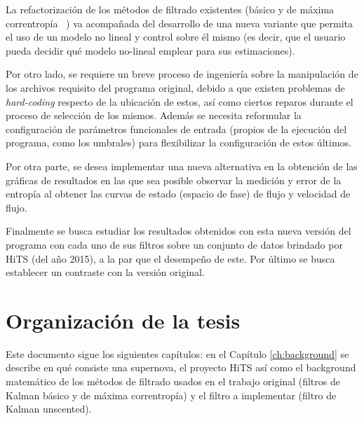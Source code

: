 La refactorizaci\'on de los m\'etodos de filtrado existentes (b\'asico y de m\'axima correntrop\'ia ~\cite{huentelemu}) va acompa\~nada del desarrollo de una nueva variante que permita el uso de un modelo no lineal y control sobre \'el mismo (es decir, que el usuario pueda decidir qu\'e modelo no-lineal emplear para sus estimaciones).
\bigskip

Por otro lado, se requiere un breve proceso de ingenier\'ia sobre la manipulaci\'on de los archivos requisito del programa original, debido a que existen problemas de \textit{hard-coding} respecto de la ubicaci\'on de estos, as\'i como ciertos reparos durante el proceso de selecci\'on de los mismos. Adem\'as se necesita reformular la configuraci\'on de par\'ametros funcionales de entrada (propios de la ejecuci\'on del programa, como los umbrales) para flexibilizar la configuraci\'on de estos \'ultimos. 
\bigskip

Por otra parte, se desea implementar una nueva alternativa en la obtenci\'on de las gr\'aficas de resultados en las que sea posible observar la medici\'on y error de la entrop\'ia al obtener las curvas de estado (espacio de fase) de flujo y velocidad de flujo. 
\bigskip

Finalmente se busca estudiar los resultados obtenidos con esta nueva versi\'on del programa con cada uno de sus filtros sobre un conjunto de datos brindado por HiTS (del a\~no 2015), a la par que el desempe\~no de este. Por \'ultimo se busca establecer un contraste con la versi\'on original.     


\section{Organizaci\'on de la tesis}

Este documento sigue los siguientes cap\'itulos: en el Cap\'itulo \ref{ch:background} se describe en qu\'e consiste una supernova, el proyecto HiTS  as\'i como el background matem\'atico de los m\'etodos de filtrado usados en el trabajo original (filtros de Kalman b\'asico y de m\'axima correntrop\'ia) y el filtro a implementar (filtro de Kalman unscented).%
\bigskip


